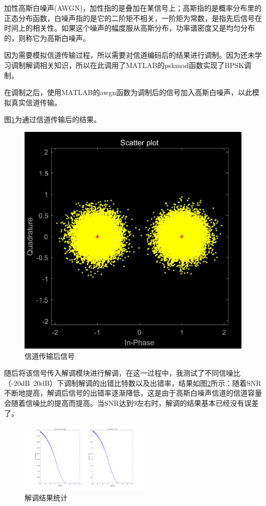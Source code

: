\documentclass{../source/zju}
\begin{document}
        加性高斯白噪声(AWGN)，加性指的是叠加在某信号上；高斯指的是概率分布里的正态分布函数，白噪声指的是它的二阶矩不相关，一阶矩为常数，是指先后信号在时间上的相关性。如果这个噪声的幅度服从高斯分布，功率谱密度又是均匀分布的，则称它为高斯白噪声。

        因为需要模拟信道传输过程，所以需要对信道编码后的结果进行调制。因为还未学习调制解调相关知识，所以在此调用了MATLAB的pskmod函数实现了BPSK调制。

        在调制之后，使用MATLAB的awgn函数为调制后的信号加入高斯白噪声，以此模拟真实信道传输。
        
        图\ref{接收信号}为通过信道传输后的结果。
        \begin{figure}[H]
            \centering
            \includegraphics[scale = 0.4]{figure/接收信号.jpg}
            \caption{信道传输后信号}
            \label{接收信号}
        \end{figure}
        随后将该信号传入解调模块进行解调，在这一过程中，我测试了不同信噪比（-20dB~20dB）下调制解调的出错比特数以及出错率，结果如图\ref{解调统计}所示：随着SNR不断地提高，解调后信号的出错率逐渐降低，这是由于高斯白噪声信道的信道容量会随着信噪比的提高而提高。当SNR达到9左右时，解调的结果基本已经没有误差了。
        \begin{figure}[H]
            \centering
            \includegraphics[width = 0.55\textwidth]{figure/解调结果.jpg}
            \caption{解调结果统计}
            \label{解调统计}
        \end{figure}
\end{document}
